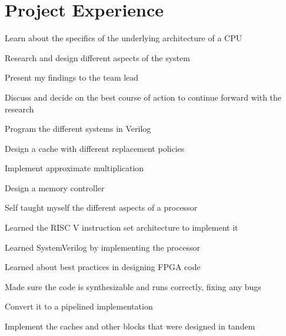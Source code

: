 \documentclass[]{deedy-resume-openfont}
\begin{document}
\begin{minipage}[t]{0.66\textwidth}

\section{Project Experience}
\begin{tightemize} \item Learn about the specifics of the underlying architecture of a CPU \item Research and design different aspects of the system \item Present my findings to the team lead \item Discuss and decide on the best course of action to continue forward with the research \item Program the different systems in Verilog \item Design a cache with different replacement policies \item Implement approximate multiplication \item Design a memory controller
\end{tightemize}
\sectionsep

\begin{tightemize} \item Self taught myself the different aspects of a processor \item Learned the RISC V instruction set architecture to implement it \item Learned SystemVerilog by implementing the processor \item Learned about best practices in designing FPGA code \item Made sure the code is synthesizable and runs correctly, fixing any bugs \item Convert it to a pipelined implementation \item Implement the caches and other blocks that were designed in tandem

\end{tightemize}
\sectionsep

\end{minipage} 
\end{document}

